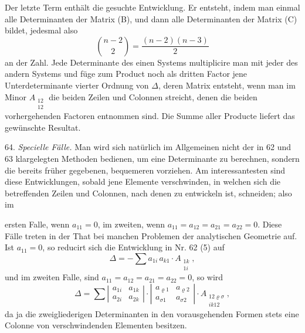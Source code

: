 \documentclass[11pt]{article}
\providecommand{\weberpage}[1]{}
\let\Delta\varDelta
\begin{document}
Der letzte Term enthält die gesuchte Entwicklung. Er entsteht, indem man einmal alle Determinanten der Matrix (B), und dann alle Determinanten der Matrix (C) bildet, jedesmal also
\[
\binom{n-2}{2} = \frac{(n-2)(n-3)}{2}
\]
an der Zahl. Jede Determinante des einen Systems multiplicire man mit jeder des andern Systems und füge zum Product noch als dritten Factor jene Unterdeterminante vierter Ordnung von $\Delta$, deren Matrix entsteht, wenn man im Minor $A_{\substack{12\\12}}$ die beiden Zeilen und Colonnen streicht, denen die beiden vorhergehenden Factoren entnommen sind. Die Summe aller Producte liefert das gewünschte Resultat.

64. \textit{Specielle F\"alle.} Man wird sich natürlich im Allgemeinen nicht der in 62 und 63 klargelegten Methoden bedienen, um eine Determinante zu berechnen, sondern die bereits früher gegebenen, bequemeren vorziehen. Am interessantesten sind diese Entwicklungen, sobald jene Elemente verschwinden, in welchen sich die betreffenden Zeilen und Colonnen, nach denen zu entwickeln ist, schneiden; also im


\weberpage{71}
ersten Falle, wenn $a_{11}=0$, im zweiten, wenn $a_{11}=a_{12}=a_{21}=a_{22}=0$. Diese Fälle treten in der That bei manchen Problemen der analytischen Geometrie auf. Ist $a_{11}=0$, so reducirt sich die Entwicklung in Nr. 62 (5) auf
\[
\Delta = -\sum a_{1i}\,a_{k1}\cdot A_{\substack{1k\\1i}},
\]
und im zweiten Falle, sind $a_{11}=a_{12}=a_{21}=a_{22}=0$, so wird
\[
\Delta = \sum \left|\begin{array}{cc} a_{1i} & a_{1k}\\ a_{2i} & a_{2k}\end{array}\right|\cdot \left|\begin{array}{cc} a_{\varrho1} & a_{\varrho2}\\ a_{\sigma1} & a_{\sigma2}\end{array}\right|\cdot A_{\substack{12\varrho\sigma\\ik12}},
\]
da ja die zweigliederigen Determinanten in den vorausgehenden Formen stets eine Colonne von verschwindenden Elementen besitzen.
\end{document}

